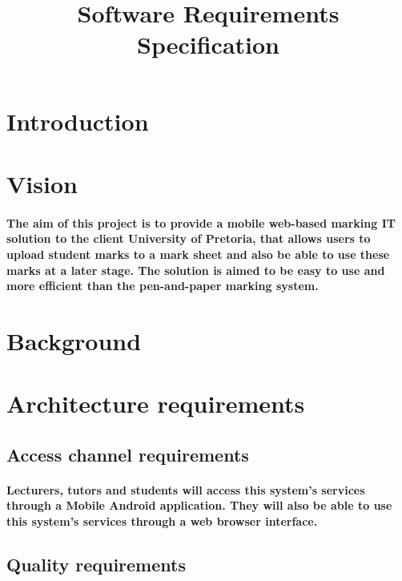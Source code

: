 \documentclass[12pt]{article}
\title{Software Requirements Specification}
\date{}
\begin{document}
  \maketitle  
  \tableofcontents
  \section{Introduction}
  \section{Vision}
  \paragraph*{The aim of this project is to provide a mobile web-based marking IT solution to the client University of Pretoria, that allows users to upload student marks to a mark sheet and also be able to use these marks at a later stage. The solution is aimed to be easy to use and more efficient than the pen-and-paper marking system.}
  \section{Background}
  \section{Architecture requirements}
  \subsection{Access channel requirements}
  \paragraph*{Lecturers, tutors and students will access this system's services through a Mobile Android application. They will also be able to use this system's services through a web browser interface.}
  \subsection{Quality requirements}
\end{document}
